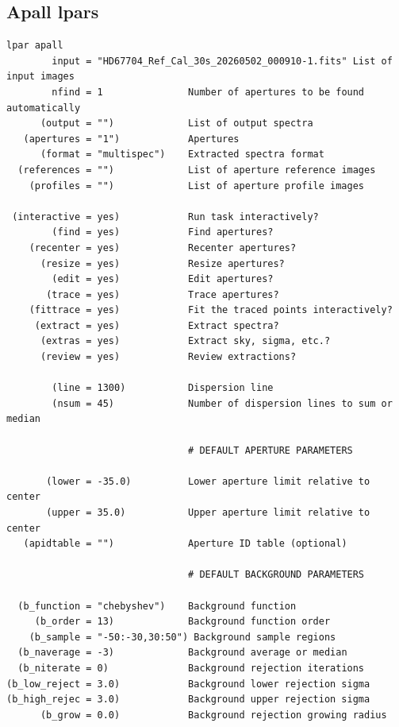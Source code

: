 \renewcommand{\footerfilename}{ApallLPARS.tex}
\subsection{Apall lpars} \label{sec:Apalllpars}

\begingroup \fontsize{10pt}{10pt}
\selectfont
\begin{verbatim} 
lpar apall
        input = "HD67704_Ref_Cal_30s_20260502_000910-1.fits" List of input images
        nfind = 1               Number of apertures to be found automatically
      (output = "")             List of output spectra
   (apertures = "1")            Apertures
      (format = "multispec")    Extracted spectra format
  (references = "")             List of aperture reference images
    (profiles = "")             List of aperture profile images

 (interactive = yes)            Run task interactively?
        (find = yes)            Find apertures?
    (recenter = yes)            Recenter apertures?
      (resize = yes)            Resize apertures?
        (edit = yes)            Edit apertures?
       (trace = yes)            Trace apertures?
    (fittrace = yes)            Fit the traced points interactively?
     (extract = yes)            Extract spectra?
      (extras = yes)            Extract sky, sigma, etc.?
      (review = yes)            Review extractions?

        (line = 1300)           Dispersion line
        (nsum = 45)             Number of dispersion lines to sum or median

                                # DEFAULT APERTURE PARAMETERS

       (lower = -35.0)          Lower aperture limit relative to center
       (upper = 35.0)           Upper aperture limit relative to center
   (apidtable = "")             Aperture ID table (optional)

                                # DEFAULT BACKGROUND PARAMETERS

  (b_function = "chebyshev")    Background function
     (b_order = 13)             Background function order
    (b_sample = "-50:-30,30:50") Background sample regions
  (b_naverage = -3)             Background average or median
  (b_niterate = 0)              Background rejection iterations
(b_low_reject = 3.0)            Background lower rejection sigma
(b_high_rejec = 3.0)            Background upper rejection sigma
      (b_grow = 0.0)            Background rejection growing radius


\end{verbatim}
